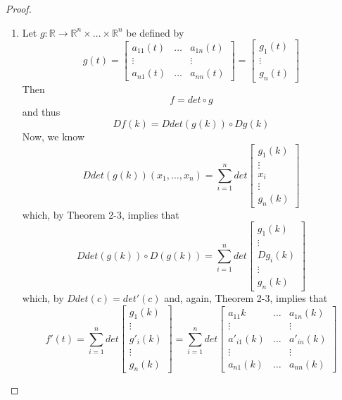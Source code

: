 \begin{enumerate}
\begin{proof}
\begin{enumerate}
        \item Let \( g: \mathbb{R} \rightarrow \mathbb{R}^n \times \ldots \times \mathbb{R}^n \) be defined by
        \[
        g(t) = \begin{bmatrix} a_{11}(t) & \ldots & a_{1n}(t) \\ \vdots & & \vdots \\ a_{n1}(t) & \ldots & a_{nn}(t) \end{bmatrix} = \begin{bmatrix} g_1(t) \\ \vdots \\ g_n(t) \end{bmatrix}
        \]
        Then
        \[
        f = det \circ g
        \]
        and thus
        \[
        Df(k) = Ddet(g(k)) \circ Dg(k) 
        \]
        Now, we know
        \[
        Ddet(g(k))(x_1,\ldots,x_n) = \sum_{i=1}^n det \begin{bmatrix} g_1(k) \\ \vdots \\ x_i \\ \vdots \\ g_n(k) \end{bmatrix}
        \]
        which, by Theorem 2-3, implies that
        \[
        Ddet(g(k)) \circ D(g(k)) = \sum_{i=1}^n det \begin{bmatrix} g_1(k) \\ \vdots \\ Dg_i(k) \\ \vdots \\ g_n(k) \end{bmatrix}
        \]
        which, by \( Ddet(c) = det'(c) \) and, again, Theorem 2-3, implies that
        \[
        f'(t) = \sum_{i=1}^n det \begin{bmatrix} g_1(k) \\ \vdots \\ g'_i (k) \\ \vdots \\ g_n(k) \end{bmatrix} = \sum_{i=1}^n det \begin{bmatrix} a_{11}{k} & \ldots & a_{1n}(k) \\ \vdots & & \vdots \\ a'_{i1}(k) & \ldots & a'_{in}(k) \\ \vdots & & \vdots \\ a_{n1}(k) & \ldots & a_{nn}(k) \end{bmatrix}
        \]
        

\end{enumerate}
\end{proof}
\end{enumerate}
